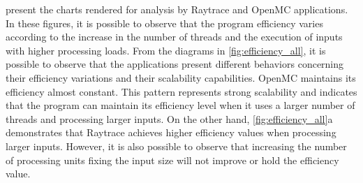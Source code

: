 
 present the charts rendered for analysis by Raytrace and OpenMC applications. In these figures, it is possible to observe that the program efficiency varies according to the increase in the number of threads and the execution of inputs with higher processing loads. From the diagrams in \cref{fig:efficiency_all}, it is possible to observe that the applications present different behaviors concerning their efficiency variations and their scalability capabilities. OpenMC maintains its efficiency almost constant. This pattern represents strong scalability and indicates that the program can maintain its efficiency level when it uses a larger number of threads and processing larger inputs. On the other hand, \cref{fig:efficiency_all}a demonstrates that Raytrace achieves higher efficiency values when processing larger inputs. However, it is also possible to observe that increasing the number of processing units fixing the input size will not improve or hold the efficiency value.

